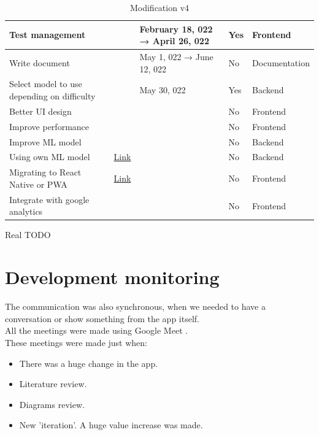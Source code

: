 \begin{table}[H]
{\begin{tabular}{|l|l|l|l|l|}
        \hline Test management &  & February 18, 022 → April 26, 022 & Yes & Frontend \\
        \hline Write document &  & May 1, 022 → June 12, 022 & No & Documentation \\
        \hline Select model to use depending on difficulty &  & May 30, 022 & Yes & Backend \\
        \hline Better UI design &  &  & No & Frontend \\
        \hline Improve performance &  &  & No & Frontend \\
        \hline Improve ML model &  &  & No & Backend \\
        \hline Using own ML model & \href{https://github.com/JesusGonzalezA/LearnASL/milestone/10}{Link} &  & No & Backend \\
        \hline Migrating to React Native or PWA & \href{https://github.com/JesusGonzalezA/LearnASL/milestone/9}{Link} &  & No & Frontend \\
        \hline Integrate with google analytics &  &  & No & Frontend \\
        \hline
    \end{tabular}
    }
\caption{Modification v4}
\label{table:planification_real_v4}
\end{table}

Real TODO

\section{Development monitoring}
The communication was also synchronous, when we needed to have a conversation or show something from the app itself. \\

All the meetings were made using Google Meet \cite{GMeet}. \\

These meetings were made just when:
\begin{itemize}
    \item There was a huge change in the app.
    \item Literature review.
    \item Diagrams review.
    \item New 'iteration'. A huge value increase was made.
\end{itemize}


